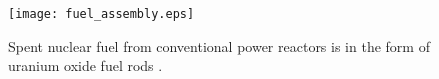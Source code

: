 \begin{figure}[htb!]
  \begin{center}
    \texttt{[image: fuel\_assembly.eps]}
  \end{center}
  \caption{Spent nuclear fuel from conventional power reactors is in the form of 
    uranium oxide fuel rods \cite{nrc_nuclear-fuel.jpg_????}.}
  \label{fig:snf}
\end{figure}
